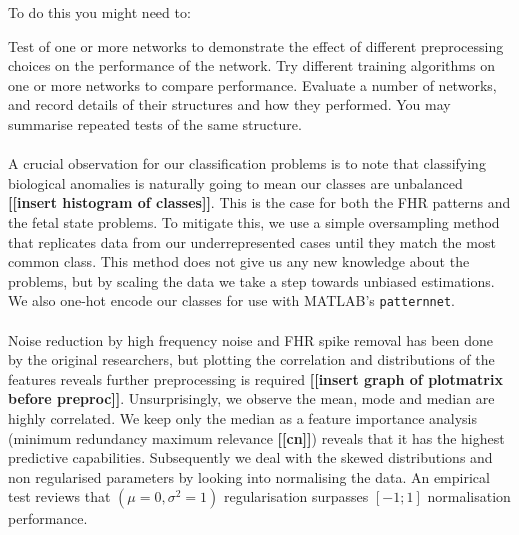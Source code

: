 \documentclass[11pt,a4paper]{article}
\begin{document}
To do this you might need to:
\begin{outline}
  \1 Test of one or more networks to demonstrate the effect of different preprocessing choices on the performance of the network.
  \1 Try different training algorithms on one or more networks to compare performance.
  \1 Evaluate a number of networks, and record details of their structures and how they performed. You may summarise repeated tests of the same structure. 
\end{outline}
\paragraph{}
A crucial observation for our classification problems is to note that classifying biological anomalies is naturally going to mean our classes are unbalanced \textbf{[[insert histogram of classes]]}. This is the case for both the FHR patterns and the fetal state problems. To mitigate this, we use a simple oversampling method that replicates data from our underrepresented cases until they match the most common class. This method does not give us any new knowledge about the problems, but by scaling the data we take a step towards unbiased estimations. We also one-hot encode our classes for use with MATLAB's \texttt{patternnet}.
\paragraph{}
Noise reduction by high frequency noise and FHR spike removal has been done by the original researchers, but plotting the correlation and distributions of the features reveals further preprocessing is required \textbf{[[insert graph of plotmatrix before preproc]]}. Unsurprisingly, we observe the mean, mode and median are highly correlated. We keep only the median as a feature importance analysis (minimum redundancy maximum relevance \textbf{[[cn]]}) reveals that it has the highest predictive capabilities. Subsequently we deal with the skewed distributions and non regularised parameters by looking into normalising the data. An empirical test reviews that \((\mu = 0, \sigma^2 = 1)\) regularisation surpasses \([-1;1]\) normalisation performance.
\end{document}
